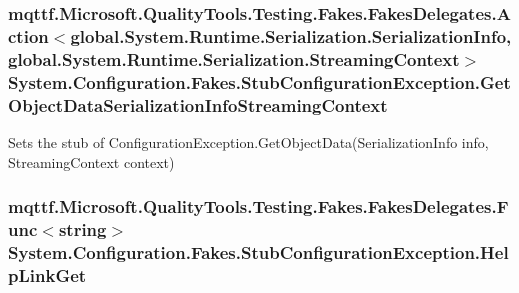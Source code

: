 \hypertarget{class_system_1_1_configuration_1_1_fakes_1_1_stub_configuration_exception_a8ffec35fd7aaf4fbf33ed74222056d41}{
\subsubsection[{Get\-Object\-Data\-Serialization\-Info\-Streaming\-Context}]{\setlength{\rightskip}{0pt plus 5cm}mqttf.\-Microsoft.\-Quality\-Tools.\-Testing.\-Fakes.\-Fakes\-Delegates.\-Action$<$global.\-System.\-Runtime.\-Serialization.\-Serialization\-Info, global.\-System.\-Runtime.\-Serialization.\-Streaming\-Context$>$ System.\-Configuration.\-Fakes.\-Stub\-Configuration\-Exception.\-Get\-Object\-Data\-Serialization\-Info\-Streaming\-Context}}\label{class_system_1_1_configuration_1_1_fakes_1_1_stub_configuration_exception_a8ffec35fd7aaf4fbf33ed74222056d41}


Sets the stub of Configuration\-Exception.\-Get\-Object\-Data(\-Serialization\-Info info, Streaming\-Context context)

\hypertarget{class_system_1_1_configuration_1_1_fakes_1_1_stub_configuration_exception_a77082bc1d39478867f3b2c9a7f73de90}{
\subsubsection[{Help\-Link\-Get}]{\setlength{\rightskip}{0pt plus 5cm}mqttf.\-Microsoft.\-Quality\-Tools.\-Testing.\-Fakes.\-Fakes\-Delegates.\-Func$<$string$>$ System.\-Configuration.\-Fakes.\-Stub\-Configuration\-Exception.\-Help\-Link\-Get}}\label{class_system_1_1_configuration_1_1_fakes_1_1_stub_configuration_exception_a77082bc1d39478867f3b2c9a7f73de90}


